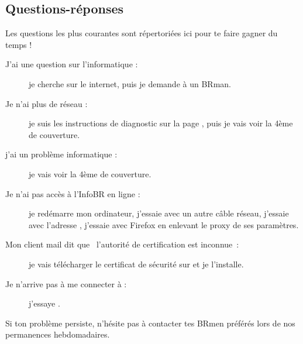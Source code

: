 \subsection{Questions-réponses}

Les questions les plus courantes sont répertoriées ici pour te faire gagner du temps !

\begin{description}

\item[J'ai une question sur l'informatique : ] je cherche sur le internet, puis je demande à un BRman.

\item[Je n'ai plus de réseau : ] je suis les instructions de diagnostic sur la page \pageref{diagnostic}, puis je vais voir la 4ème de couverture.

\item[j'ai un problème informatique : ] je vais voir la 4ème de couverture.

\item[Je n'ai pas accès à l'InfoBR en ligne : ] je redémarre mon ordinateur, j'essaie avec un autre câble réseau, j'essaie avec l'adresse , j'essaie avec Firefox en enlevant le proxy de ses paramètres.

\item[Mon client mail dit que \guillemotleft~l'autorité de certification est inconnue~\guillemotright : ] je vais télécharger le certificat de sécurité
sur  et je l'installe.


\item[Je n'arrive pas à me connecter à  : ] j'essaye .




\end{description}

Si ton problème persiste, n'hésite pas à contacter tes BRmen préférés lors de nos permanences hebdomadaires.